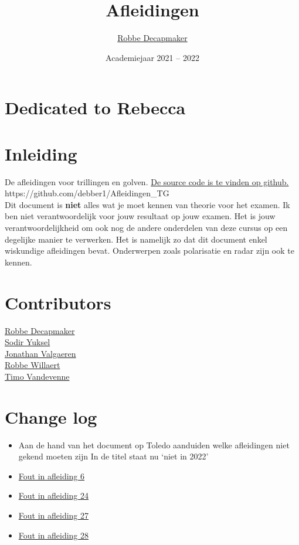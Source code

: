 \documentclass[a4paper,kul]{kulakarticle} %
\date{Academiejaar 2021 -- 2022}
\title{Afleidingen}
\author{\href{https://github.com/debber1}{Robbe Decapmaker}}
\begin{document}
\maketitle
\section*{Dedicated to Rebecca}
\section*{Inleiding}

De afleidingen voor trillingen en golven. \href{https://github.com/debber1/Afleidingen_TG}{De source code is te vinden op github.}\\
https://github.com/debber1/Afleidingen\_TG\\
\newline
Dit document is \textbf{niet} alles wat je moet kennen van theorie voor het examen. Ik ben niet verantwoordelijk voor jouw resultaat op jouw examen. Het is jouw verantwoordelijkheid om ook nog de andere onderdelen van deze cursus op een degelijke manier te verwerken. Het is namelijk zo dat dit document enkel wiskundige afleidingen bevat. Onderwerpen zoals polarisatie en radar zijn ook te kennen.\\

\section*{Contributors}
\href{https://github.com/debber1}{Robbe Decapmaker}\\
\href{https://github.com/sydon1}{Sodir Yuksel} \\
\href{https://github.com/ItsAlphie}{Jonathan Valgaeren}\\
\href{https://github.com/Robope}{Robbe Willaert}\\
\href{https://github.com/TimoNotThy}{Timo Vandevenne}
\section*{Change log}
\begin{itemize}
	\item Aan de hand van het document op Toledo aanduiden welke afleidingen niet gekend moeten zijn 
	\subitem In de titel staat nu `niet in 2022'
	\item \href{https://github.com/debber1/Afleidingen_TG/issues/16}{Fout in afleiding 6}
	\item \href{https://github.com/debber1/Afleidingen_TG/issues/17}{Fout in afleiding 24}
	\item \href{https://github.com/debber1/Afleidingen_TG/issues/18}{Fout in afleiding 27}
	\item \href{https://github.com/debber1/Afleidingen_TG/issues/19}{Fout in afleiding 28}
\end{itemize}
\end{document}
